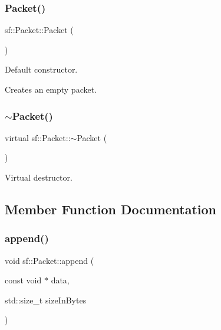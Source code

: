 \subsubsection{\texorpdfstring{Packet()}{Packet()}}
{\footnotesize\ttfamily sf\+::\+Packet\+::\+Packet (\begin{DoxyParamCaption}{ }\end{DoxyParamCaption})}



Default constructor. 

Creates an empty packet. \begin{DoxyVerb}\end{DoxyVerb}
 \mbox{\label{classsf_1_1_packet_adc0490ca3c7c3d1e321bd742e5213913}} 
\subsubsection{\texorpdfstring{$\sim$Packet()}{~Packet()}}
{\footnotesize\ttfamily virtual sf\+::\+Packet\+::$\sim$\+Packet (\begin{DoxyParamCaption}{ }\end{DoxyParamCaption})\hspace{0.3cm}{\ttfamily [virtual]}}



Virtual destructor. 

\begin{DoxyVerb}\end{DoxyVerb}
 

\subsection{Member Function Documentation}
\mbox{\label{classsf_1_1_packet_a7dd6e429b87520008326c4d71f1cf011}} 
\subsubsection{\texorpdfstring{append()}{append()}}
{\footnotesize\ttfamily void sf\+::\+Packet\+::append (\begin{DoxyParamCaption}\item[{const void $\ast$}]{data,  }\item[{std\+::size\+\_\+t}]{size\+In\+Bytes }\end{DoxyParamCaption})}



